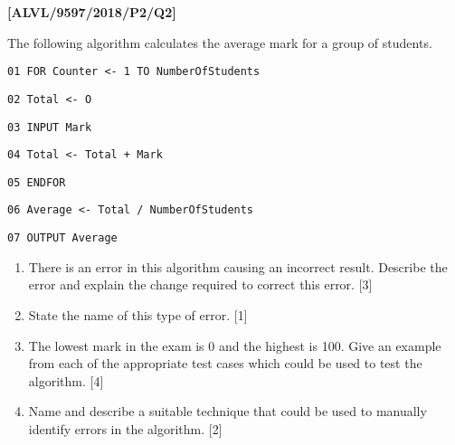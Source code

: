 \item \textbf{{[}ALVL/9597/2018/P2/Q2{]} }

The following algorithm calculates the average mark for a group of
students. 

\noindent\begin{minipage}[t]{1\columnwidth}%
\texttt{01 FOR Counter <- 1 TO NumberOfStudents}

\texttt{02 \qquad{}Total <- O}

\texttt{03 \qquad{}INPUT Mark}

\texttt{04 \qquad{}Total <- Total + Mark}

\texttt{05 ENDFOR}

\texttt{06 Average <- Total / NumberOfStudents}

\texttt{07 OUTPUT Average}%
\end{minipage}
\begin{enumerate}
\item There is an error in this algorithm causing an incorrect result. Describe
the error and explain the change required to correct this error. \hfill{}{[}3{]}
\item State the name of this type of error.\hfill{} {[}1{]}
\item The lowest mark in the exam is 0 and the highest is 100. Give an example
from each of the appropriate test cases which could be used to test
the algorithm. \hfill{}{[}4{]}
\item Name and describe a suitable technique that could be used to manually
identify errors in the algorithm. \hfill{}{[}2{]}
\end{enumerate}